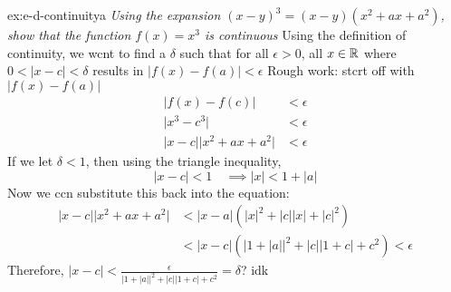 \documentclass[landscape, 8pt]{extarticle}
\begin{document}
\begin{multicols}{3}
\begin{xmp}{ex:e-d-continuity}{a}
\textit{Using the expansion $(x-y)^{3} = (x-y)(x^{2}+ax+a^{2})$, show that the function $f(x) = x^{3}$ is continuous}
\vspace{0pt}\newline
Using the definition of continuity, we wcnt to find a $\delta$ such that for all $\epsilon> 0$, all $x\in\mathbb{R}$ where $0 < \lvert x-c\rvert  < \delta$ results in $\lvert f(x) - f(a)\rvert < \epsilon$
\vspace{0pt}\newline
Rough work: stcrt off with $\lvert f(x)-f(a)\rvert$
\[\begin{aligned}
    \lvert f(x) - f(c)\rvert &< \epsilon\\
    \lvert x^{3} - c^{3} \rvert &< \epsilon\\
    \lvert x-c\rvert \lvert x^{2}+ax+a^{2}\rvert &< \epsilon 
\end{aligned}\]
If we let $\delta < 1$, then using the triangle inequality,
\[\lvert x - c\rvert < 1 \quad \implies \lvert x\rvert < 1 + \lvert a\rvert \]
Now we ccn substitute this back into the equation:
\[\begin{aligned}
    \lvert x-c\rvert \lvert x^{2}+ax+a^{2}\rvert &< \lvert x-a\rvert \left( \lvert x \rvert^{2} + \lvert c\rvert \lvert x\rvert +\lvert c\rvert^{2} \right)\\
    &<\lvert x-c\rvert (\lvert 1 + \lvert a\rvert \rvert^{2} + \lvert c\rvert \lvert 1 + c\rvert + c^{2} ) < \epsilon
\end{aligned}\]
Therefore, $\lvert x-c\rvert < \displaystyle \frac{\epsilon}{\lvert 1 + \lvert a\rvert \rvert^{2} + \lvert c\rvert \lvert 1 + c\rvert + c^{2}} = \delta$?
idk
\end{xmp}
\vspace{-5pt}

\lipsum[1-12]
\end{multicols}
\end{document}

